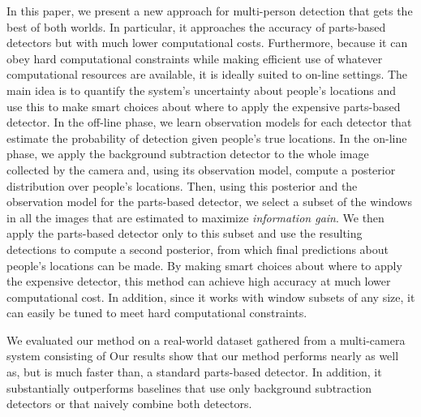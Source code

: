 \documentclass[10pt,twocolumn,letterpaper]{article}
\begin{document}
In this paper, we present a new approach for multi-person detection that gets the best of both worlds. In particular, it approaches the accuracy of parts-based detectors but with much lower computational costs. Furthermore, because it can obey hard computational constraints while making efficient use of whatever computational resources are available, it is ideally suited to on-line settings.
The main idea is to quantify the system's uncertainty about people's locations and use this to make smart choices about where to apply the expensive parts-based detector. In the off-line phase, we learn observation models for each detector that estimate the probability of detection given people's true locations. In the on-line phase, we apply the background subtraction detector to the whole image collected by the camera and, using its observation model, compute a posterior distribution over people's locations. Then, using this posterior and the observation model for the parts-based detector, we select a subset of the windows in all the images that are estimated to maximize \emph{information gain}. We then apply the parts-based detector only to this subset and use the resulting detections to compute a second posterior, from which final predictions about people's locations can be made. By making smart choices about where to apply the expensive detector, this method can achieve high accuracy at much lower computational cost. In addition, since it works with window subsets of any size, it can easily be tuned to meet hard computational constraints.

We evaluated our method on a real-world dataset gathered from a multi-camera system  consisting of  Our results show that our method performs nearly as well as, but is much faster than, a standard parts-based detector. In addition, it substantially outperforms baselines that use only background subtraction detectors or that naively combine both detectors.
\end{document}
